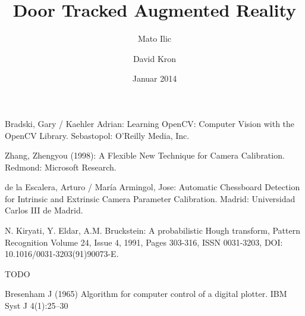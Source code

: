 \documentclass[listof=totocnumbered,bibliography=totocnumbered,12pt,oneside]{scrreprt}
\makeatletter
\numberwithin{equation}{subsection}
\def\@afterindentfalse{\let\if@afterindent\iffalse}
\makeatother
\begin{document}
\pagestyle{fancy}
\def\@afterindentfalse{\let\if@afterindent\iffalse}

\subject{Bachelor-Thesis}
\title{Door Tracked Augmented Reality}
\author{Mato Ilic \and David Kron}
\date{Januar 2014}
\publishers{Betreuer: Marcus Hudritsch\\Experte: Andreas Dürsteler}

\maketitle


\newpage

\tableofcontents
\newpage


\newpage


\newpage


\newpage

%


\newpage


\newpage


\newpage


\newpage


\newpage


\newpage
\begin{thebibliography}{5}

Bradski, Gary / Kaehler Adrian:
Learning OpenCV: Computer Vision with the OpenCV Library.
Sebastopol: O'Reilly Media, Inc.

Zhang, Zhengyou (1998): A Flexible New Technique for Camera Calibration. 
Redmond: Microsoft Research.

de la Escalera, Arturo / María Armingol, Jose: Automatic Chessboard Detection for Intrinsic and Extrinsic Camera Parameter Calibration. 
Madrid: Universidad Carlos III de Madrid.

N. Kiryati, Y. Eldar, A.M. Bruckstein:
A probabilistic Hough transform, Pattern Recognition 
Volume 24, Issue 4, 1991, Pages 303-316, ISSN 0031-3203, DOI: 10.1016/0031-3203(91)90073-E. 

TODO

Bresenham J (1965) Algorithm for computer control of a digital plotter. IBM Syst J 4(1):25–30

\end{thebibliography}
\end{document}
